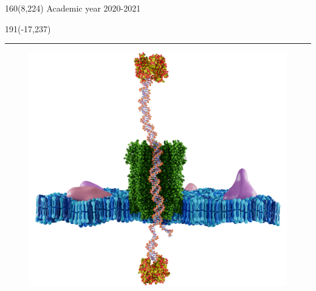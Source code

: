 %
\begin{textblock}{160}(8,224)
\textblockcolour{}
\vspace{-\parskip}
\flushright
Academic year 2020-2021
\end{textblock}
%
\begin{textblock}{191}(-17,237)
{\color{blueline}\rule{550pt}{5.5pt}}
\end{textblock}
%
\vspace*{5.7cm}
\begin{center}
\begin{figure}[H]
\centering
\includegraphics[scale=0.166]{Figures/CoverPhoto2.png}
\end{figure}
\end{center}
%
\vfill
